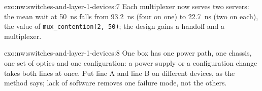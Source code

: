 \begin{solution}{exo:nw:switches-and-layer-1-devices:7}
Each multiplexer now serves two servers: the mean wait at \qty{50}{\nano\second} falls from 93.2~ns (four on one) to 22.7~ns (two
on each), the value of \texttt{mux\_contention(2, 50)}; the design gains a handoff and a multiplexer.
\end{solution}

\begin{solution}{exo:nw:switches-and-layer-1-devices:8}
One box has one power path, one chassis, one set of optics and one configuration: a power supply or a configuration change takes
both lines at once. Put line A and line B on different devices, as the method says; lack of software removes one failure mode,
not the others.
\end{solution}

